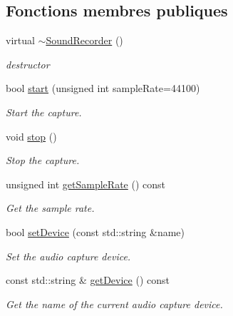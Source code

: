 \subsection*{Fonctions membres publiques}
\begin{DoxyCompactItemize}
\item 
\mbox{\label{classsf_1_1SoundRecorder_acc599e61aaa47edaae88cf43f0a43549}} 
virtual \hyperlink{classsf_1_1SoundRecorder_acc599e61aaa47edaae88cf43f0a43549}{$\sim$\+Sound\+Recorder} ()
\begin{DoxyCompactList}\small\item\em destructor \end{DoxyCompactList}\item 
bool \hyperlink{classsf_1_1SoundRecorder_a715f0fd2f228c83d79aaedca562ae51f}{start} (unsigned int sample\+Rate=44100)
\begin{DoxyCompactList}\small\item\em Start the capture. \end{DoxyCompactList}\item 
void \hyperlink{classsf_1_1SoundRecorder_a8d9c8346aa9aa409cfed4a1101159c4c}{stop} ()
\begin{DoxyCompactList}\small\item\em Stop the capture. \end{DoxyCompactList}\item 
unsigned int \hyperlink{classsf_1_1SoundRecorder_aed292c297a3e0d627db4eb5c18f58c44}{get\+Sample\+Rate} () const
\begin{DoxyCompactList}\small\item\em Get the sample rate. \end{DoxyCompactList}\item 
bool \hyperlink{classsf_1_1SoundRecorder_a8eb3e473292c16e874322815836d3cd3}{set\+Device} (const std\+::string \&name)
\begin{DoxyCompactList}\small\item\em Set the audio capture device. \end{DoxyCompactList}\item 
const std\+::string \& \hyperlink{classsf_1_1SoundRecorder_ab16cd53c6884cbf3380c017cee72ba81}{get\+Device} () const
\begin{DoxyCompactList}\small\item\em Get the name of the current audio capture device. \end{DoxyCompactList}\end{DoxyCompactItemize}
